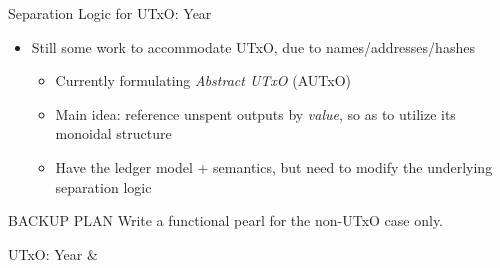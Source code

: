 \documentclass[aspectratio=169]{beamer}
\newcommand\I{\textgoth{I}\xspace}
\newcommand\II{\textgoth{II}\xspace}
\newcommand\IV{\textgoth{IV}\xspace}
\begin{document}
\begin{frame}{Separation Logic for UTxO: Year \IV}
\begin{itemize}
\item Still some work to accommodate UTxO, due to names/addresses/hashes
  \begin{itemize}
  \item Currently formulating \textit{Abstract UTxO} (AUTxO)
  \item Main idea: reference unspent outputs by \textit{value}, so as to utilize its monoidal structure
  \item Have the ledger model + semantics, but need to modify the underlying separation logic
  \end{itemize}
\end{itemize}
\begin{alertblock}{BACKUP PLAN}
Write a functional pearl for the non-UTxO case only.
\end{alertblock}
\end{frame}


\newcommand\citedet{%
\textbf{FMBC @ FLOC'20}\\
Determinism of ledger updates\\
\scriptsize{\textit{
P.Vinogradova, A.Knispel, J.Chapman, O.Melkonian
}}}
\newcommand\citeccem{%
\textbf{FMBC @ FLOC'20}\\
Designing EUTxO smart contracts as communicating state machines: the case of simulating accounts\\
\scriptsize{\textit{
P.Vinogradova, M.Chakravarty, J.Chapman, T.Ferariu, M.P.Jones, J.Krijnen
}}}
\newcommand\citeformal{%
\textbf{FMBC @ FLOC'20}\\
Human and machine-readable models of state machines for the Cardano ledger\\
\scriptsize{\textit{
A.Knispel, O.Melkonian, J.Chapman, P.Vinogradova
}}}

\begin{frame}{UTxO: Year \I \& \II}
\begin{center}
\end{center}
\end{frame}
\end{document}
